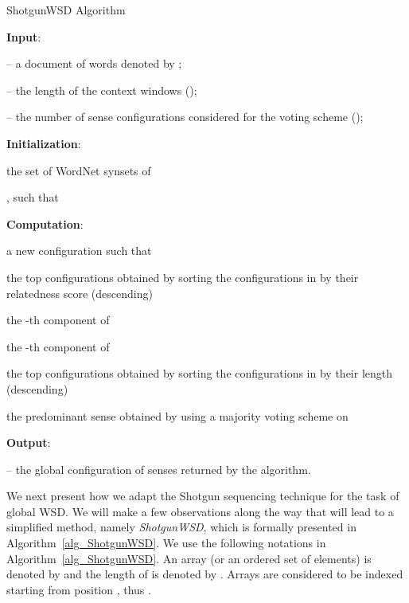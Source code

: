 \documentclass[11pt]{article}
\begin{document}
\begin{algorithm*}[!th]
\small{
\caption{ShotgunWSD Algorithm\label{alg_ShotgunWSD}}

\textbf{Input}: 

 -- a document of  words denoted by ;

 -- the length of the context windows ();

 -- the number of sense configurations considered for the voting scheme ();

\BlankLine
\textbf{Initialization}:

\;

\For{}
{		
		 the set of WordNet synsets of \;
}

\;

, such that \;

\BlankLine
\textbf{Computation}:

\For{}
{
		\;
		
		{
				 a new configuration   such that \;
				
				\;
				
				\For{}
				{
						\For{}
						{
								\;
						}
				}
				
				\;
		}
		
		 the top  configurations obtained by sorting the configurations in  by their relatedness score (descending)\;
		
		\;
}

\For{}
{
		\For{}
		{
				 the -th component of \;
	
				\For{}
				{
						 the -th component of \;
				
						{
								\;
								
								\For{}
								{
										\If{}
										{
												\;
										}
								}
								
								\If{}
								{
										\;
									
										\;
									
										\For{}
										{
												\For{}
												{
													\;
												}
										}
									
										\;
								}
						}
				}
		}
}

\For{}
{
		\;		
		
		 the top  configurations obtained by sorting the configurations in  by their length (descending)\;
		
		 the predominant sense obtained by using a majority voting scheme on \;
		
		\;
}

\BlankLine
\textbf{Output}: 

  -- the global configuration of senses returned by the algorithm.
}
\end{algorithm*}
We next present how we adapt the Shotgun sequencing technique for the task of global WSD. We will make a few observations along the way that will lead to a simplified method, namely \emph{ShotgunWSD}, which is formally presented in Algorithm~\ref{alg_ShotgunWSD}. We use the following notations in Algorithm~\ref{alg_ShotgunWSD}. An array (or an ordered set of elements) is denoted by  and the length of  is denoted by . Arrays are considered to be indexed starting from position , thus . 
\end{document}

